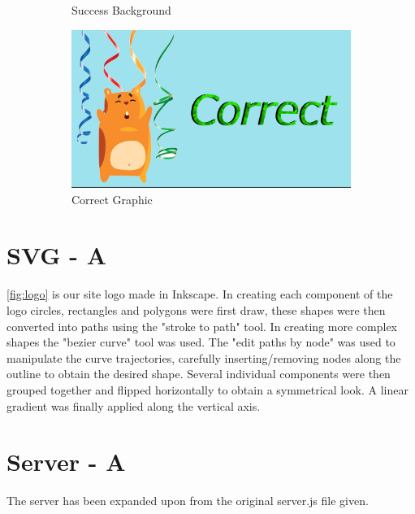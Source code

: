 \documentclass[a4paper]{article}
\begin{document}
\begin{figure}[h!]
\begin{subfigure}[b]{0.3\linewidth}
    \caption{Success Background}
    \label{fig:success_background}
   \end{subfigure}
   \begin{subfigure}[b]{0.3\linewidth}
    \includegraphics[width=\linewidth]{png-creation/success-graphic.png}
    \caption{Correct Graphic}
    \label{fig:correct_graphic}
  \end{subfigure}
  \caption{}
\end{figure}

\section{SVG - A}
\ref{fig:logo} is our site logo made in Inkscape.
In creating each component of the logo circles, rectangles and polygons were first draw, these shapes were then converted into paths using the "stroke to path" tool. In creating more complex shapes the "bezier curve" tool was used.
The "edit paths by node" was used to manipulate the curve trajectories,
carefully inserting/removing nodes along the outline to obtain the desired shape. 
Several individual components were then grouped together and flipped horizontally to obtain a symmetrical look.
A linear gradient was finally applied along the vertical axis.

\section{Server - A}
The server has been expanded upon from the original server.js file given.
\end{document}
